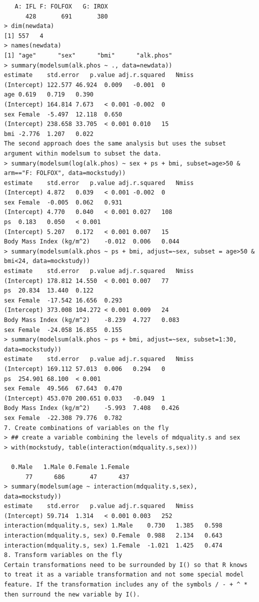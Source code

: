 \documentclass[
]{book}
\begin{document}
\begin{verbatim}
   A: IFL F: FOLFOX   G: IROX 
      428       691       380 
> dim(newdata)
[1] 557   4
> names(newdata)
[1] "age"      "sex"      "bmi"      "alk.phos"
> summary(modelsum(alk.phos ~ ., data=newdata))
estimate    std.error   p.value adj.r.squared   Nmiss
(Intercept) 122.577 46.924  0.009   -0.001  0
age 0.619   0.719   0.390       
(Intercept) 164.814 7.673   < 0.001 -0.002  0
sex Female  -5.497  12.118  0.650       
(Intercept) 238.658 33.705  < 0.001 0.010   15
bmi -2.776  1.207   0.022       
The second approach does the same analysis but uses the subset argument within modelsum to subset the data.
> summary(modelsum(log(alk.phos) ~ sex + ps + bmi, subset=age>50 & arm=="F: FOLFOX", data=mockstudy))
estimate    std.error   p.value adj.r.squared   Nmiss
(Intercept) 4.872   0.039   < 0.001 -0.002  0
sex Female  -0.005  0.062   0.931       
(Intercept) 4.770   0.040   < 0.001 0.027   108
ps  0.183   0.050   < 0.001     
(Intercept) 5.207   0.172   < 0.001 0.007   15
Body Mass Index (kg/m^2)    -0.012  0.006   0.044       
> summary(modelsum(alk.phos ~ ps + bmi, adjust=~sex, subset = age>50 & bmi<24, data=mockstudy))
estimate    std.error   p.value adj.r.squared   Nmiss
(Intercept) 178.812 14.550  < 0.001 0.007   77
ps  20.834  13.440  0.122       
sex Female  -17.542 16.656  0.293       
(Intercept) 373.008 104.272 < 0.001 0.009   24
Body Mass Index (kg/m^2)    -8.239  4.727   0.083       
sex Female  -24.058 16.855  0.155       
> summary(modelsum(alk.phos ~ ps + bmi, adjust=~sex, subset=1:30, data=mockstudy))
estimate    std.error   p.value adj.r.squared   Nmiss
(Intercept) 169.112 57.013  0.006   0.294   0
ps  254.901 68.100  < 0.001     
sex Female  49.566  67.643  0.470       
(Intercept) 453.070 200.651 0.033   -0.049  1
Body Mass Index (kg/m^2)    -5.993  7.408   0.426       
sex Female  -22.308 79.776  0.782       
7. Create combinations of variables on the fly
> ## create a variable combining the levels of mdquality.s and sex
> with(mockstudy, table(interaction(mdquality.s,sex)))

  0.Male   1.Male 0.Female 1.Female 
      77      686       47      437 
> summary(modelsum(age ~ interaction(mdquality.s,sex), data=mockstudy))
estimate    std.error   p.value adj.r.squared   Nmiss
(Intercept) 59.714  1.314   < 0.001 0.003   252
interaction(mdquality.s, sex) 1.Male    0.730   1.385   0.598       
interaction(mdquality.s, sex) 0.Female  0.988   2.134   0.643       
interaction(mdquality.s, sex) 1.Female  -1.021  1.425   0.474       
8. Transform variables on the fly
Certain transformations need to be surrounded by I() so that R knows to treat it as a variable transformation and not some special model feature. If the transformation includes any of the symbols / - + ^ * then surround the new variable by I().


\end{verbatim}
\end{document}
